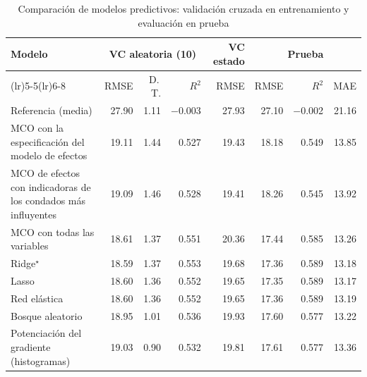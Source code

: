 \begin{table}[htbp]
\centering
\footnotesize
\caption{Comparación de modelos predictivos: validación cruzada en entrenamiento y evaluación en prueba}\label{tab:prediccion}
\begin{tabularx}{\linewidth}{>{\raggedright\arraybackslash}X r r r r r r r}
\toprule
Modelo & \multicolumn{3}{c}{VC aleatoria (10)} & VC estado & \multicolumn{3}{c}{Prueba} \\ \cmidrule(lr){2-4}\cmidrule(lr){5-5}\cmidrule(lr){6-8} & RMSE & D.\,T. & $R^2$ & RMSE & RMSE & $R^2$ & MAE \\
\midrule
Referencia (media) & \num{27.90} & \num{1.11} & \num{-0.003} & \num{27.93} & \num{27.10} & \num{-0.002} & \num{21.16} \\
MCO con la especificación del modelo de efectos & \num{19.11} & \num{1.44} & \num{0.527} & \num{19.43} & \num{18.18} & \num{0.549} & \num{13.85} \\
MCO de efectos con indicadoras de los condados más influyentes & \num{19.09} & \num{1.46} & \num{0.528} & \num{19.41} & \num{18.26} & \num{0.545} & \num{13.92} \\
MCO con todas las variables & \num{18.61} & \num{1.37} & \num{0.551} & \num{20.36} & \num{17.44} & \num{0.585} & \num{13.26} \\
Ridge$^\star$ & \num{18.59} & \num{1.37} & \num{0.553} & \num{19.68} & \num{17.36} & \num{0.589} & \num{13.18} \\
Lasso & \num{18.60} & \num{1.36} & \num{0.552} & \num{19.65} & \num{17.35} & \num{0.589} & \num{13.17} \\
Red elástica & \num{18.60} & \num{1.36} & \num{0.552} & \num{19.65} & \num{17.36} & \num{0.589} & \num{13.19} \\
Bosque aleatorio & \num{18.95} & \num{1.01} & \num{0.536} & \num{19.93} & \num{17.60} & \num{0.577} & \num{13.22} \\
Potenciación del gradiente (histogramas) & \num{19.03} & \num{0.90} & \num{0.532} & \num{19.81} & \num{17.61} & \num{0.577} & \num{13.36} \\
\bottomrule
\end{tabularx}
\par{}
\end{table}
